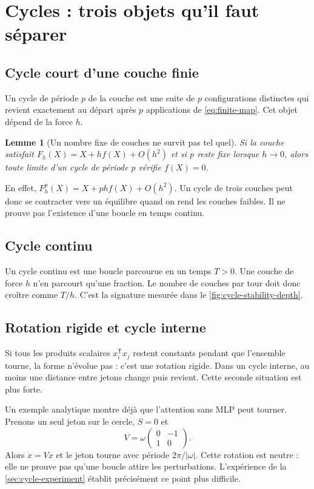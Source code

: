 \documentclass[11pt,a4paper]{article}
\newtheorem{lemma}[theorem]{Lemme}
\theoremstyle{definition}
\newcommand{\T}{\mathsf T}
\begin{document}
\section{Cycles : trois objets qu'il faut séparer}
\label{sec:cycles}

\subsection{Cycle court d'une couche finie}

Un cycle de période $p$ de la couche est une suite de $p$ configurations distinctes qui
revient exactement au départ après $p$ applications de \eqref{eq:finite-map}. Cet objet
dépend de la force $h$.

\begin{lemma}[Un nombre fixe de couches ne survit pas tel quel]
\label{lem:fixed-period}
Si la couche satisfait $F_h(X)=X+h f(X)+O(h^2)$ et si $p$ reste fixe lorsque $h\to0$,
alors toute limite d'un cycle de période $p$ vérifie $f(X)=0$.
\end{lemma}

En effet, $F_h^p(X)=X+phf(X)+O(h^2)$. Un cycle de trois couches peut donc se contracter
vers un équilibre quand on rend les couches faibles. Il ne prouve pas l'existence d'une
boucle en temps continu.

\subsection{Cycle continu}

Un cycle continu est une boucle parcourue en un temps $T>0$. Une couche de force $h$
n'en parcourt qu'une fraction. Le nombre de couches par tour doit donc croître comme
$T/h$. C'est la signature mesurée dans le \cref{fig:cycle-stability-depth}.

\subsection{Rotation rigide et cycle interne}

Si tous les produits scalaires $x_i^{\T}x_j$ restent constants pendant que l'ensemble
tourne, la forme n'évolue pas : c'est une rotation rigide. Dans un cycle interne, au moins
une distance entre jetons change puis revient. Cette seconde situation est plus forte.

Un exemple analytique montre déjà que l'attention sans MLP peut tourner. Prenons un seul
jeton sur le cercle, $S=0$ et
\[
 V=\omega\begin{pmatrix}0&-1\\1&0\end{pmatrix}.
\]
Alors $\dot x=Vx$ et le jeton tourne avec période $2\pi/|\omega|$. Cette rotation est
neutre : elle ne prouve pas qu'une boucle attire les perturbations. L'expérience de la
\cref{sec:cycle-experiment} établit précisément ce point plus difficile.
\end{document}
